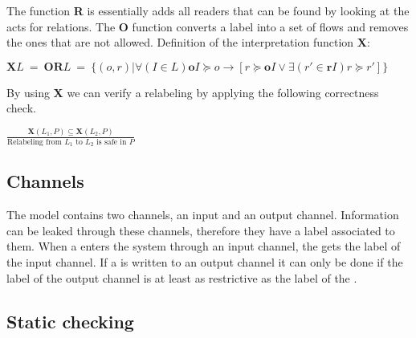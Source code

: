The function \textbf{R} is essentially adds all readers that can be found by looking at the acts for relations.
The \textbf{O} function converts a label into a set of flows and removes the ones that are not allowed.
Definition of the interpretation function $\textbf{X}$:
\begin{definition}
  $\textbf{X}L \ = \ \textbf{OR}L \ = \ \{(o,r)|\forall (I \in L) \textbf{o}I \succeq o \rightarrow [r \succeq \textbf{o}I \vee \exists (r' \in \textbf{r}I) r \succeq r'] \}$
\end{definition}

By using \textbf{X} we can verify a relabeling by applying the following correctness check.
\begin{definition}
  $\frac{\textbf{X}(L_1, P)\subseteq \textbf{X}(L_2,P)}{\text{Relabeling from } L_1 \text{ to } L_2 \text{ is safe in } P }$
\end{definition}

\subsection{Channels}
The model contains two channels, an input and an output channel.
Information can be leaked through these channels, therefore they have a label associated to them.
When a \xvalue{} enters the system through an input channel, the \xvalue{} gets the label of the input channel.
If a \xvalue{} is written to an output channel it can only be done if the label of the output channel is at least as restrictive as the label of the \xvalue{}.

\subsection{Static checking}

